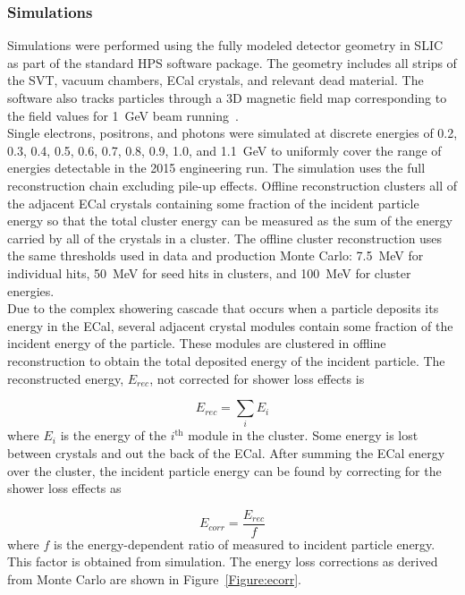 \subsubsection{Simulations}
Simulations were performed using the fully modeled detector geometry in SLIC as part of the standard HPS software package. The geometry includes all strips of the SVT, vacuum chambers, ECal crystals, and relevant dead material. The software also tracks particles through a 3D magnetic field map corresponding to the field values for 1~GeV beam running~\cite{szumila-vance_hps_2016}.\\
\indent Single electrons, positrons, and photons were simulated at discrete energies of 0.2, 0.3, 0.4, 0.5, 0.6, 0.7, 0.8,  0.9, 1.0, and 1.1~GeV to uniformly cover the range of energies detectable in the 2015 engineering run. The simulation uses the full reconstruction chain excluding pile-up effects. Offline reconstruction clusters all of the adjacent ECal crystals containing some fraction of the incident particle energy so that the total cluster energy can be measured as the sum of the energy carried by all of the crystals in a cluster. The offline cluster reconstruction uses the same thresholds used in data and production Monte Carlo: 7.5~MeV for individual hits, 50~MeV for seed hits in clusters, and 100~MeV for cluster energies.\\
\indent Due to the complex showering cascade that occurs when a particle deposits its energy in the ECal, several adjacent crystal modules contain some fraction of the incident energy of the particle. These modules are clustered in offline reconstruction to obtain the total deposited energy of the incident particle. The reconstructed energy, $E_{rec}$, not corrected for shower loss effects is 

\begin{equation}
\label{eq:eclsum}
E_{rec} = \sum_i E_i    
\end{equation}
where $E_i$ is the energy of the $i^{\textrm{th}}$ module in the cluster. Some energy is lost between crystals and out the back of the ECal. After summing the ECal energy over the cluster, the incident particle energy can be found by correcting for the shower loss effects as  

\begin{equation}
\label{eq:eclsf}
E_{corr} = \dfrac{E_{rec}}{f}   
\end{equation}
where $f$ is the energy-dependent ratio of measured to incident particle energy. This factor is obtained from simulation. The energy loss corrections as derived from Monte Carlo are shown in Figure~\ref{Figure:ecorr}.

